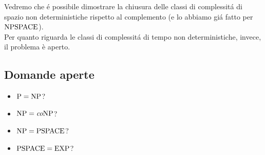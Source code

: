 Vedremo che é possibile dimostrare la chiusura delle classi di complessitá di spazio non deterministiche rispetto al complemento
(e lo abbiamo giá fatto per $\text{NPSPACE}$). \\
Per quanto riguarda le classi di complessitá di tempo non deterministiche, invece, il problema è aperto.


\subsection{Domande aperte}
\begin{itemize}
    \item $\text{P} = \text{NP}$?
    \item $\text{NP} = \textit{co}\text{NP}$?
    \item $\text{NP} = \text{PSPACE}$?
    \item $\text{PSPACE} = \text{EXP}$?
\end{itemize}
